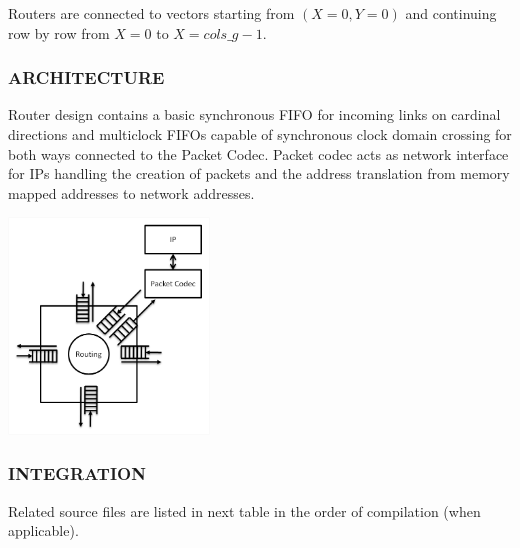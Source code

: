 \documentclass[a4paper,10pt,oneside,final]{article}
\begin{document}
Routers are connected to vectors starting from $(X=0, Y=0)$ and continuing
row by row from $X=0$ to $X=cols\_g-1$.



\subsubsection{ARCHITECTURE}

Router design contains a basic synchronous FIFO for incoming links on
cardinal directions and multiclock FIFOs capable of synchronous clock
domain crossing for both ways connected to the Packet Codec. Packet
codec acts as network interface for IPs handling the creation of
packets and the address translation from memory mapped addresses to
network addresses.

\begin{center}  
  \includegraphics[width=0.4\textwidth]{pic/router_arch.png}
\end{center}

\subsubsection{INTEGRATION}

Related  source  files  are listed  in  next  table  in the  order  of
compilation (when applicable).
\end{document}
